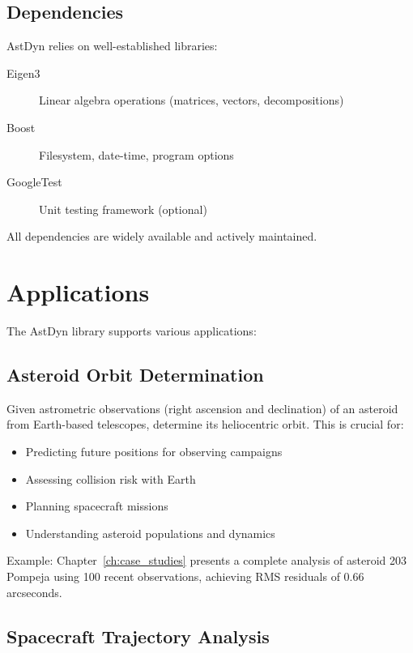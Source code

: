 \subsection{Dependencies}

AstDyn relies on well-established libraries:

\begin{description}
    \item[Eigen3] Linear algebra operations (matrices, vectors, decompositions)
    \item[Boost] Filesystem, date-time, program options
    \item[GoogleTest] Unit testing framework (optional)
\end{description}

All dependencies are widely available and actively maintained.

\section{Applications}

The AstDyn library supports various applications:

\subsection{Asteroid Orbit Determination}

Given astrometric observations (right ascension and declination) of an asteroid from Earth-based telescopes, determine its heliocentric orbit. This is crucial for:

\begin{itemize}
    \item Predicting future positions for observing campaigns
    \item Assessing collision risk with Earth
    \item Planning spacecraft missions
    \item Understanding asteroid populations and dynamics
\end{itemize}

Example: Chapter~\ref{ch:case_studies} presents a complete analysis of asteroid 203 Pompeja using 100 recent observations, achieving RMS residuals of 0.66 arcseconds.

\subsection{Spacecraft Trajectory Analysis}

